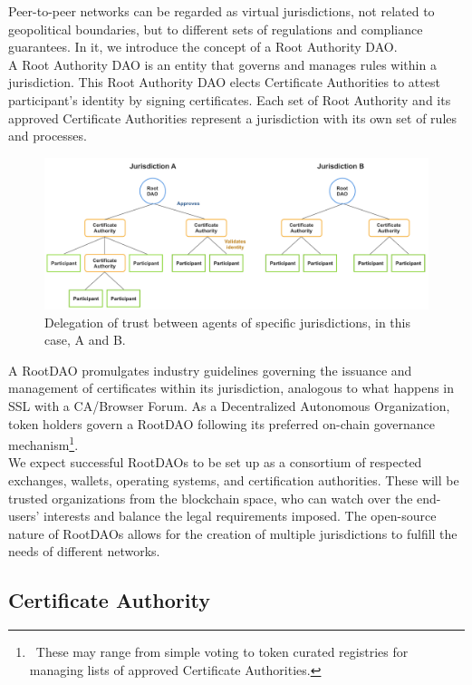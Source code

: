 \documentclass[10pt]{article}
\begin{document}
Peer-to-peer networks can be regarded as virtual jurisdictions, not related to geopolitical boundaries, but to different sets of regulations and compliance guarantees. In it, we introduce the concept of a Root Authority DAO. \\

\noindent A Root Authority DAO is an entity that governs and manages rules within a jurisdiction. This Root Authority DAO elects Certificate Authorities to attest participant’s identity by signing certificates. Each set of Root Authority and its approved Certificate Authorities represent a jurisdiction with its own set of rules and processes.\\

\begin{figure}[ht]
    \centering
    \includegraphics[width=0.8\linewidth]{figures/figure1.png}
    \caption{Delegation of trust between agents of specific jurisdictions, in this case, A and B.}
    \label{fig:fig1}
\end{figure}

\noindent A RootDAO promulgates industry guidelines governing the issuance and management of certificates within its jurisdiction, analogous to what happens in SSL with a CA/Browser Forum\cite{cabforum}. As a Decentralized Autonomous Organization, token holders govern a RootDAO following its preferred on-chain governance mechanism\footnote{\ These may range from simple voting to token curated registries for managing lists of approved Certificate Authorities.}. \\

\noindent We expect successful RootDAOs to be set up as a consortium of respected exchanges, wallets, operating systems, and certification authorities. These will be trusted organizations from the blockchain space, who can watch over the end-users' interests and balance the legal requirements imposed. The open-source nature of RootDAOs allows for the creation of multiple jurisdictions to fulfill the needs of different networks. \\

\subsection{Certificate Authority}
\end{document}
